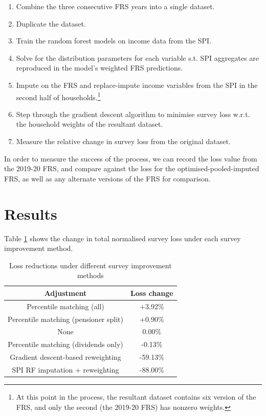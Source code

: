 \documentclass[10pt,journal,compsoc]{IEEEtran}
\begin{document}
\begin{enumerate}
  \item Combine the three consecutive FRS years into a single dataset.
  \item Duplicate the dataset.
  \item Train the random forest models on income data from the SPI.
  \item Solve for the distribution parameters for each variable s.t. SPI aggregates are reproduced in the model's weighted FRS predictions.
  \item Impute on the FRS and replace-impute income variables from the SPI in the second half of households.\footnote{At this point in the process, the resultant dataset contains six version of the FRS, and only the second (the 2019-20 FRS) has nonzero weights.}
  \item Step through the gradient descent algorithm to minimise survey loss w.r.t. the household weights of the resultant dataset.
  \item Measure the relative change in survey loss from the original dataset.
\end{enumerate}

In order to measure the success of the process, we can record the loss value from the 2019-20 FRS, and compare against the loss for the optimised-pooled-imputed FRS, as well as any alternate versions of the FRS for comparison. 

\section{Results}

Table \ref{tab:loss_reduction} shows the change in total normalised survey loss under each survey improvement method.

\begin{table}[!ht]
  \caption{Loss reductions under different survey improvement methods}
  \label{tab:loss_reduction}
  \centering
  \begin{tabular}{cc}
    \hline\hline
    Adjustment & Loss change \\
    \hline
    Percentile matching (all) &      +3.92\% \\
    Percentile matching (pensioner split) &      +0.90\% \\
    None &       0.00\% \\
    Percentile matching (dividends only) &      -0.13\% \\
    Gradient descent-based reweighting &     -59.13\% \\
    SPI RF imputation + reweighting &     -88.00\% \\
  \hline\hline
  \end{tabular}
\end{table}
\end{document}

